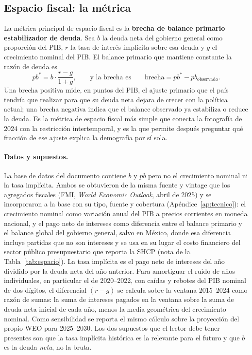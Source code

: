 \documentclass[12pt, letterpaper]{article}
\begin{document}
\subsection{Espacio fiscal: la métrica}
\label{sec:espacio}

La métrica principal de espacio fiscal es la \textbf{brecha de balance primario
estabilizador de deuda}. Sea $b$ la deuda neta del gobierno general como
proporción del PIB, $r$ la tasa de interés implícita sobre esa deuda y $g$ el
crecimiento nominal del PIB. El balance primario que mantiene constante la razón de
deuda es
\begin{equation}
  pb^{*} = b \cdot \frac{r - g}{1 + g},
  \qquad\text{y la brecha es}\qquad
  \text{brecha} = pb^{*} - pb_{\text{observado}}.
  \label{eq:pbstar}
\end{equation}
Una brecha positiva mide, en puntos del PIB, el ajuste primario que el país tendría
que realizar para que su deuda neta dejara de crecer con la política actual; una
brecha negativa indica que el balance observado ya estabiliza o reduce la deuda. Es
la métrica de espacio fiscal más simple que conecta la fotografía de 2024 con la
restricción intertemporal, y es la que permite después preguntar qué fracción de
ese ajuste explica la demografía por sí sola.

\paragraph{Datos y supuestos.} La base de datos del documento contiene $b$ y $pb$
pero no el crecimiento nominal ni la tasa implícita. Ambos se obtuvieron de la
misma fuente y vintage que los agregados fiscales (FMI, \emph{World Economic
Outlook}, abril de 2025) y se incorporaron a la base con su tipo, fuente y
cobertura (Apéndice~\ref{ap:tecnico}): el crecimiento nominal como variación anual
del PIB a precios corrientes en moneda nacional, y el pago neto de intereses como
diferencia entre el balance primario y el balance global del gobierno general,
salvo en México, donde esa diferencia incluye partidas que no son intereses y se
usa en su lugar el costo financiero del sector público presupuestario que reporta
la SHCP (nota de la Tabla~\ref{tab:espacio}). La tasa implícita es el pago neto de intereses del año dividido por la deuda neta del
año anterior. Para amortiguar el ruido de años individuales, en particular el de
2020--2022, con caídas y rebotes del PIB nominal de dos dígitos, el diferencial
$(r-g)$ se calcula sobre la ventana 2015--2024 como razón de sumas: la suma de
intereses pagados en la ventana sobre la suma de deuda neta inicial de cada año,
menos la media geométrica del crecimiento nominal. Como sensibilidad se reporta el
mismo cálculo sobre la proyección del propio WEO para 2025--2030. Los dos supuestos
que el lector debe tener presentes son que la tasa implícita histórica es la
relevante para el futuro y que $b$ es la deuda \emph{neta}, no la bruta.
\end{document}
